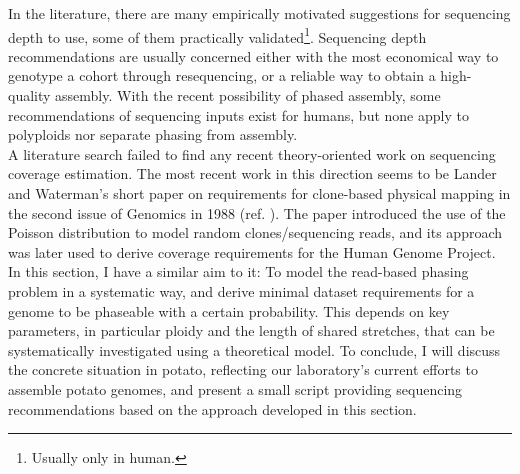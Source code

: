 In the literature, there are many empirically motivated suggestions for sequencing depth to use, some of them practically validated\footnote{Usually only in human.}\cite{sarashetti24, schell25, ebpseqrecs}.
Sequencing depth recommendations are usually concerned either with the most economical way to genotype a cohort through resequencing, or a reliable way to obtain a high-quality assembly.
With the recent possibility of phased assembly, some recommendations of sequencing inputs exist for humans, but none apply to polyploids nor separate phasing from assembly\cite{sarashetti24}.\\
A literature search failed to find any recent theory-oriented work on sequencing coverage estimation.
The most recent work in this direction seems to be Lander and Waterman's short paper on requirements for clone-based physical mapping in the second issue of Genomics in 1988 (ref. \cite{lander88}).
The paper introduced the use of the Poisson distribution to model random clones/sequencing reads, and its approach was later used to derive coverage requirements for the Human Genome Project\cite{illuminaseqrecs}.\\
In this section, I have a similar aim to it:
To model the read-based phasing problem in a systematic way, and derive minimal dataset requirements for a genome to be phaseable with a certain probability.
This depends on key parameters, in particular ploidy and the length of shared stretches, that can be systematically investigated using a theoretical model.
To conclude, I will discuss the concrete situation in potato, reflecting our laboratory's current efforts to assemble potato genomes, and present a small script providing sequencing recommendations based on the approach developed in this section.



